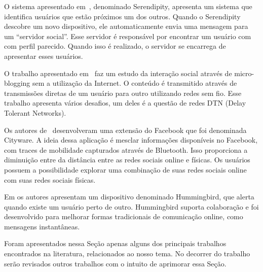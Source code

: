 O sistema apresentado em~\cite{SocialSerendipity}, denominado Serendipity,  apresenta um sistema que
identifica usuários que estão próximos um dos outros. Quando o
Serendipity descobre um novo dispositivo, ele automaticamente envia uma
mensagem para um ``servidor social''. Esse servidor é responsável por
encontrar um usuário com com perfil parecido. Quando isso é realizado, o
servidor se encarrega de apresentar esses usuários.

O trabalho apresentado em~\cite{Uttering}
faz um estudo da interação social através de micro-blogging sem a
utilização da Internet. O conteúdo é transmitido através de transmissões
diretas de um usuário para outro utilizando redes sem fio. Esse trabalho
apresenta vários desafios, um deles é a questão de redes DTN (Delay
Tolerant Networks).

Os autores de~\cite{SocialNetworking} desenvolveram uma extensão
do Facebook que foi denominada Cityware. A ideia dessa aplicação é
    mesclar informações disponíveis no Facebook, com traces de
    mobilidade capturados através de Bluetooth. Isso proporciona a
    diminuição entre da distância entre as redes sociais online e
    físicas. Os usuários possuem a possibilidade explorar uma combinação
    de suas redes sociais online com suas redes sociais físicas.

Em \cite{Hummingbird} os autores apresentam um dispositivo denominado
Hummingbird, que alerta quando existe um usuário perto de outro.
Hummingbird suporta colaboração e foi desenvolvido para melhorar formas
tradicionais de comunicação online, como mensagens instantâneas.

Foram apresentados nessa Seção apenas alguns dos principais trabalhos
encontrados na literatura, relacionados ao nosso tema. No decorrer do
trabalho serão revisados outros trabalhos com o intuito de
aprimorar essa Seção. 

